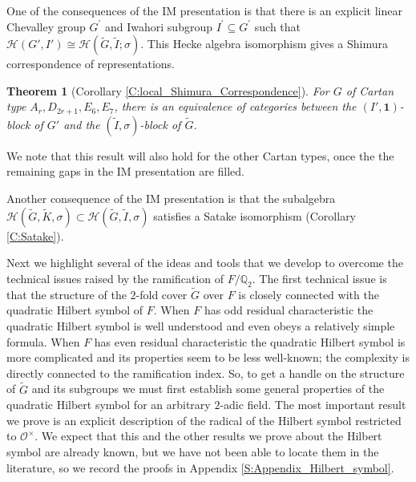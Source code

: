 \documentclass[10pt, letterpaper]{amsart}
\theoremstyle{plain}
\newtheorem{Thm}[equation]{Theorem}
\theoremstyle{definition}
\numberwithin{equation}{section}
\newcommand{\Gt}{\widetilde{G}}
\newcommand{\It}{\widetilde{I}}
\newcommand{\Kt}{\widetilde{K}}
\newcommand{\Ocal}{\mathcal{O}}
\newcommand{\Hcal}{\mathcal{H}}
\newcommand{\one}{\mathbf{1}}
\begin{document}
One of the consequences of the IM presentation is that there is an explicit linear Chevalley group $G^{\prime}$ and Iwahori subgroup $I^{\prime}\subseteq G^{\prime}$ such that $\Hcal(G', I')\cong\Hcal(\Gt, \It; \sigma)$. This Hecke algebra isomorphism gives a Shimura correspondence of representations.

\begin{Thm}[Corollary \ref{C:local_Shimura_Correspondence}]
    For $G$ of Cartan type $A_{r},D_{2r+1},E_{6},E_{7}$, there is an equivalence of categories between the $(I',\one)$-block of $G'$ and the $(\It, \sigma)$-block of $\Gt$.
\end{Thm}
We note that this result will also hold for the other Cartan types, once the the remaining gaps in the IM presentation are filled. 

Another consequence of the IM presentation is that the subalgebra $\Hcal(\Gt,\Kt,\sigma)\subset \Hcal(\Gt,\It,\sigma)$ satisfies a Satake isomorphism (Corollary \ref{C:Satake}). 


\quad

Next we highlight several of the ideas and tools that we develop to overcome the technical issues raised by the ramification of $F/\mathbb{Q}_{2}$. The first technical issue is that the structure of the $2$-fold cover $\Gt$ over $F$ is closely connected with the quadratic Hilbert symbol of $F$. When $F$ has odd residual characteristic the quadratic Hilbert symbol is well understood and even obeys a relatively simple formula. 
When $F$ has even residual characteristic the quadratic Hilbert symbol is more complicated and its properties seem to be less well-known; the complexity is directly connected to the ramification index. So, to get a handle on the structure of $\Gt$ and its subgroups we must first establish some general properties of the quadratic Hilbert symbol for an arbitrary $2$-adic field. The most important result we prove is an explicit description of the radical of the Hilbert symbol restricted to $\Ocal^{\times}$. We expect that this and the other results we prove about the Hilbert symbol are already known, but we have not been able to locate them in the literature, so we record the proofs in Appendix \ref{S:Appendix_Hilbert_symbol}.
\end{document}
